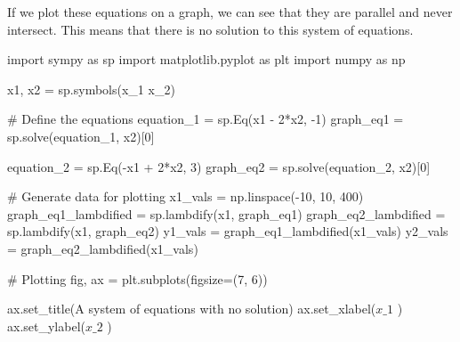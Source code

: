 \documentclass[
  letterpaper,
  DIV=11,
  numbers=noendperiod]{scrreprt}
\newenvironment{Shaded}{\begin{snugshade}}{\end{snugshade}}
\newcommand{\CommentTok}[1]{\textcolor[rgb]{0.37,0.37,0.37}{#1}}
\newcommand{\DecValTok}[1]{\textcolor[rgb]{0.68,0.00,0.00}{#1}}
\newcommand{\ImportTok}[1]{\textcolor[rgb]{0.00,0.46,0.62}{#1}}
\newcommand{\NormalTok}[1]{\textcolor[rgb]{0.00,0.23,0.31}{#1}}
\newcommand{\OperatorTok}[1]{\textcolor[rgb]{0.37,0.37,0.37}{#1}}
\newcommand{\StringTok}[1]{\textcolor[rgb]{0.13,0.47,0.30}{#1}}
\begin{document}
If we plot these equations on a graph, we can see that they are parallel
and never intersect. This means that there is no solution to this system
of equations.

\begin{Shaded}
\begin{Highlighting}[]
\ImportTok{import}\NormalTok{ sympy }\ImportTok{as}\NormalTok{ sp}
\ImportTok{import}\NormalTok{ matplotlib.pyplot }\ImportTok{as}\NormalTok{ plt}
\ImportTok{import}\NormalTok{ numpy }\ImportTok{as}\NormalTok{ np}

\NormalTok{x1, x2 }\OperatorTok{=}\NormalTok{ sp.symbols(}\StringTok{\textquotesingle{}x\_1 x\_2\textquotesingle{}}\NormalTok{)}

\CommentTok{\# Define the equations}
\NormalTok{equation\_1 }\OperatorTok{=}\NormalTok{ sp.Eq(x1 }\OperatorTok{{-}} \DecValTok{2}\OperatorTok{*}\NormalTok{x2, }\OperatorTok{{-}}\DecValTok{1}\NormalTok{)}
\NormalTok{graph\_eq1 }\OperatorTok{=}\NormalTok{ sp.solve(equation\_1, x2)[}\DecValTok{0}\NormalTok{]}

\NormalTok{equation\_2 }\OperatorTok{=}\NormalTok{ sp.Eq(}\OperatorTok{{-}}\NormalTok{x1 }\OperatorTok{+} \DecValTok{2}\OperatorTok{*}\NormalTok{x2, }\DecValTok{3}\NormalTok{)}
\NormalTok{graph\_eq2 }\OperatorTok{=}\NormalTok{ sp.solve(equation\_2, x2)[}\DecValTok{0}\NormalTok{]}

\CommentTok{\# Generate data for plotting}
\NormalTok{x1\_vals }\OperatorTok{=}\NormalTok{ np.linspace(}\OperatorTok{{-}}\DecValTok{10}\NormalTok{, }\DecValTok{10}\NormalTok{, }\DecValTok{400}\NormalTok{)}
\NormalTok{graph\_eq1\_lambdified }\OperatorTok{=}\NormalTok{ sp.lambdify(x1, graph\_eq1)}
\NormalTok{graph\_eq2\_lambdified }\OperatorTok{=}\NormalTok{ sp.lambdify(x1, graph\_eq2)}
\NormalTok{y1\_vals }\OperatorTok{=}\NormalTok{ graph\_eq1\_lambdified(x1\_vals)}
\NormalTok{y2\_vals }\OperatorTok{=}\NormalTok{ graph\_eq2\_lambdified(x1\_vals)}

\CommentTok{\# Plotting}
\NormalTok{fig, ax }\OperatorTok{=}\NormalTok{ plt.subplots(figsize}\OperatorTok{=}\NormalTok{(}\DecValTok{7}\NormalTok{, }\DecValTok{6}\NormalTok{))}

\NormalTok{ax.set\_title(}\StringTok{\textquotesingle{}A system of equations with no solution\textquotesingle{}}\NormalTok{)}
\NormalTok{ax.set\_xlabel(}\StringTok{\textquotesingle{}$x\_1$                                                                                                                            \textquotesingle{}}\NormalTok{)}
\NormalTok{ax.set\_ylabel(}\StringTok{\textquotesingle{}$x\_2$                                                                                                    \textquotesingle{}}\NormalTok{)}


\end{Highlighting}
\end{Shaded}
\end{document}
